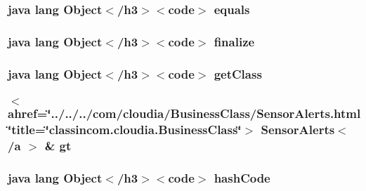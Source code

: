 \hypertarget{_sensor_8html_a8974318cea585f72df717e0380ec7104}{
\subsubsection[{equals}]{\setlength{\rightskip}{0pt plus 5cm}java lang Object$<$/h3$>$$<$code$>$ equals}}\label{_sensor_8html_a8974318cea585f72df717e0380ec7104}
\hypertarget{_sensor_8html_ab2315181ead4aeedef2374039b6ddde7}{
\subsubsection[{finalize}]{\setlength{\rightskip}{0pt plus 5cm}java lang Object$<$/h3$>$$<$code$>$ finalize}}\label{_sensor_8html_ab2315181ead4aeedef2374039b6ddde7}
\hypertarget{_sensor_8html_a98e6644727fe65eac217a6855045be43}{
\subsubsection[{get\-Class}]{\setlength{\rightskip}{0pt plus 5cm}java lang Object$<$/h3$>$$<$code$>$ get\-Class}}\label{_sensor_8html_a98e6644727fe65eac217a6855045be43}
\hypertarget{_sensor_8html_a33e7128ae06bbd715018ed96dac575eb}{
\subsubsection[{gt}]{\setlength{\rightskip}{0pt plus 5cm}$<$ ahref=\char`\"{}../../../com/cloudia/Business\-Class/Sensor\-Alerts.\-html\char`\"{}title=\char`\"{}classincom.\-cloudia.\-Business\-Class\char`\"{}$>$ Sensor\-Alerts$<$/{\bf a} $>$ \& gt}}\label{_sensor_8html_a33e7128ae06bbd715018ed96dac575eb}
\hypertarget{_sensor_8html_a8e178e2bb2bef055ea23ea3910a221ca}{
\subsubsection[{hash\-Code}]{\setlength{\rightskip}{0pt plus 5cm}java lang Object$<$/h3$>$$<$code$>$ hash\-Code}}\label{_sensor_8html_a8e178e2bb2bef055ea23ea3910a221ca}
